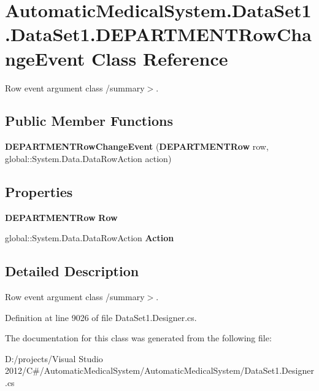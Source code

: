\section{AutomaticMedicalSystem.DataSet1.DataSet1.DEPARTMENTRowChangeEvent Class Reference}
\label{class_automatic_medical_system_1_1_data_set1_1_1_d_e_p_a_r_t_m_e_n_t_row_change_event}
Row event argument class /summary$>$.  


\subsection*{Public Member Functions}
\begin{CompactItemize}
\item 
\textbf{DEPARTMENTRowChangeEvent} ({\bf DEPARTMENTRow} row, global::System.Data.DataRowAction action)\label{class_automatic_medical_system_1_1_data_set1_1_1_d_e_p_a_r_t_m_e_n_t_row_change_event_34105bd7cd3ff6a277fc13af61f8c091}

\end{CompactItemize}
\subsection*{Properties}
\begin{CompactItemize}
\item 
{\bf DEPARTMENTRow} \textbf{Row}\hspace{0.3cm}{\tt  [get]}\label{class_automatic_medical_system_1_1_data_set1_1_1_d_e_p_a_r_t_m_e_n_t_row_change_event_f163734e6f63ca32a2372bd865fff29d}

\item 
global::System.Data.DataRowAction \textbf{Action}\hspace{0.3cm}{\tt  [get]}\label{class_automatic_medical_system_1_1_data_set1_1_1_d_e_p_a_r_t_m_e_n_t_row_change_event_89a5449793fcf682bbf40382b71dfbdc}

\end{CompactItemize}


\subsection{Detailed Description}
Row event argument class /summary$>$. 

Definition at line 9026 of file DataSet1.Designer.cs.

The documentation for this class was generated from the following file:\begin{CompactItemize}
\item 
D:/projects/Visual Studio 2012/C\#/AutomaticMedicalSystem/AutomaticMedicalSystem/DataSet1.Designer.cs\end{CompactItemize}
